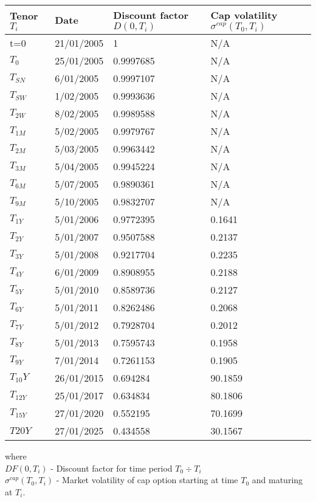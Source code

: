 \documentclass[11pt]{article}
\numberwithin{equation}{subsection}
\begin{document}
{
	\centering
	\begin{tabular}{|l|l|l|l|}
		\hline
		Tenor \(T_i\) & Date & Discount factor \(D(0, T_i)\) & Cap volatility \(\sigma^{cap}(T_0, T_i)\) \\		
		\hline		
		t=0	  &  21/01/2005 &  1	      &  N/A \\
		\hline
		\(T_0\)	  &  25/01/2005 &  0.9997685  &  N/A \\
		\hline
		\(T_{SN}\)  &  6/01/2005  &  0.9997107  &  N/A \\
		\hline
		\(T_{SW}\)  &  1/02/2005  &  0.9993636  &  N/A \\
		\hline
		\(T_{2W}\)  &  8/02/2005  &  0.9989588  &  N/A \\
		\hline
		\(T_{1M}\)  &  5/02/2005  &  0.9979767  &  N/A \\
		\hline
		\(T_{2M}\)  &  5/03/2005  &  0.9963442  &  N/A \\
		\hline
		\(T_{3M}\)  &  5/04/2005  &  0.9945224  &  N/A \\
		\hline
		\(T_{6M}\)  &  5/07/2005  &  0.9890361  &  N/A \\
		\hline
		\(T_{9M}\)  &  5/10/2005  &  0.9832707  &  N/A \\
		\hline
		\(T_{1Y}\)  &  5/01/2006  &  0.9772395  &  0.1641 \\
		\hline
		\(T_{2Y}\)  &  5/01/2007  &  0.9507588  &  0.2137 \\
		\hline
		\(T_{3Y}\)  &  5/01/2008  &  0.9217704  &  0.2235 \\
		\hline
		\(T_{4Y}\)  &  6/01/2009  &  0.8908955  &  0.2188 \\
		\hline
		\(T_{5Y}\)  &  5/01/2010  &  0.8589736  &  0.2127 \\
		\hline
		\(T_{6Y}\)  &  5/01/2011  &  0.8262486  &  0.2068 \\
		\hline
		\(T_{7Y}\)  &  5/01/2012  &  0.7928704  &  0.2012 \\
		\hline
		\(T_{8Y}\)  &  5/01/2013  &  0.7595743  &  0.1958 \\
		\hline
		\(T_{9Y}\)  &  7/01/2014  &  0.7261153  &  0.1905 \\
		\hline
		\(T_{10}Y\)  &  26/01/2015 &  0.694284   &  90.1859 \\
		\hline
		\(T_{12Y}\)  &  25/01/2017 &  0.634834   &  80.1806 \\
		\hline
		\(T_{15Y}\)  &  27/01/2020 &  0.552195   &  70.1699 \\
		\hline
		\(T{20Y}\)  &  27/01/2025 &  0.434558   &  30.1567 \\
		\hline				 				
	\end{tabular}
}
\vskip 0.4cm
where \\
\(DF(0, T_i)\) - Discount factor for time period \(T_0 \div T_i\)\\
\(\sigma^{cap}(T_0, T_i)\) - Market volatility of cap option starting at time \(T_0\) and maturing at \(T_i\).
\end{document}
